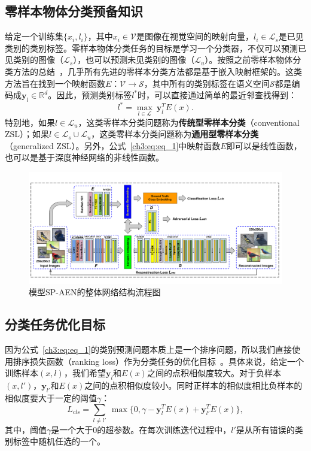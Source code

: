 \subsection{零样本物体分类预备知识}
给定一个训练集$\{x_i, l_i\}$，其中$x_i\in\mathcal{V}$是图像在视觉空间的映射向量，$l_i\in \mathcal{L}_s$是已见类别的类别标签。零样本物体分类任务的目标是学习一个分类器，不仅可以预测已见类别的图像（$\mathcal{L}_s$），也可以预测未见类别的图像（$\mathcal{L}_u$）。按照之前零样本物体分类方法的总结~\cite{xian2017zero,lei2015predicting}，几乎所有先进的零样本分类方法都是基于嵌入映射框架的。这类方法旨在找到一个映射函数$E$：$\mathcal{V}\rightarrow \mathcal{S}$，其中所有的类别标签在语义空间$\mathcal{S}$都是编码成$\bm{y}_l\in\mathbb{R}^d$。因此，预测类别标签$l^*$时，可以直接通过简单的最近邻查找得到：
\begin{equation}\label{ch3:eq:eq_1}
l^* = \max_{l\in\mathcal{L}}~\bm{y}^T_l E(x).
\end{equation}
特别地，如果$l\in\mathcal{L}_u$，这类零样本分类问题称为\textbf{传统型零样本分类}（conventional ZSL）；如果$l \in\mathcal{L}_s\cup \mathcal{L}_u$，这类零样本分类问题称为\textbf{通用型零样本分类}（generalized ZSL）。另外，公式~\eqref{ch3:eq:eq_1}中映射函数$E$即可以是线性函数，也可以是基于深度神经网络的非线性函数。


\begin{figure}[tbp]
    \centering
        \includegraphics[width=\linewidth]{chapter3/res/sp_aen.pdf}
    \caption{模型SP-AEN的整体网络结构流程图}
    \label{ch3:fig:sp_aen}
\end{figure}


\subsection{分类任务优化目标}
因为公式~\eqref{ch3:eq:eq_1}的类别预测问题本质上是一个排序问题，所以我们直接使用排序损失函数（ranking loss）作为分类任务的优化目标~\cite{frome2013devise,weston2010large}。具体来说，给定一个训练样本$(x, l)$，我们希望$\bm{y}_l$和$E(x)$之间的点积相似度较大。对于负样本$(x,l')$，$\bm{y}_{l'}$和$E(x)$之间的点积相似度较小。同时正样本的相似度相比负样本的相似度要大于一定的阈值$\gamma$：
\begin{equation} \label{ch3:eq:eq_2}
L_{cls} = \sum\limits_{l\neq l'}~\max\{0, \gamma - \bm{y}_l^T E(x) + \bm{y}^T_{l'} E(x)\},
\end{equation}
其中，阈值$\gamma$是一个大于0的超参数。在每次训练迭代过程中，$l'$是从所有错误的类别标签中随机任选的一个。

